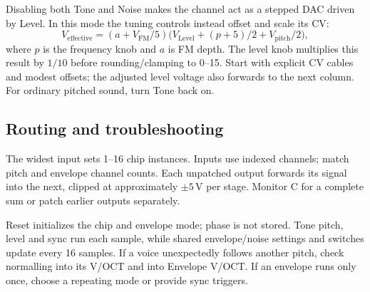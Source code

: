 Disabling both Tone and Noise makes the channel act as a stepped DAC driven
by Level. In this mode the tuning controls instead offset and scale its CV:
\[
 V_\mathrm{effective}=(a+V_\mathrm{FM}/5)
 \bigl(V_\mathrm{Level}+(p+5)/2+V_\mathrm{pitch}/2\bigr),
\]
where $p$ is the frequency knob and $a$ is FM depth. The level knob multiplies
this result by $1/10$ before rounding/clamping to 0--15. Start with explicit
CV cables and modest offsets; the adjusted level voltage also forwards to
the next column. For ordinary pitched sound, turn Tone back on.

\subsection{Routing and troubleshooting}
The widest input sets 1--16 chip instances. Inputs use indexed channels;
match pitch and envelope channel counts. Each unpatched output forwards
its signal into the next, clipped at approximately $\pm5$\,V per stage.
Monitor C for a complete sum or patch earlier outputs separately.

Reset initializes the chip and envelope mode; phase is not stored. Tone
pitch, level and sync run each sample, while shared envelope/noise settings
and switches update every 16 samples. If a voice unexpectedly follows another
pitch, check normalling into its V/OCT and into Envelope V/OCT. If an envelope
runs only once, choose a repeating mode or provide sync triggers.
